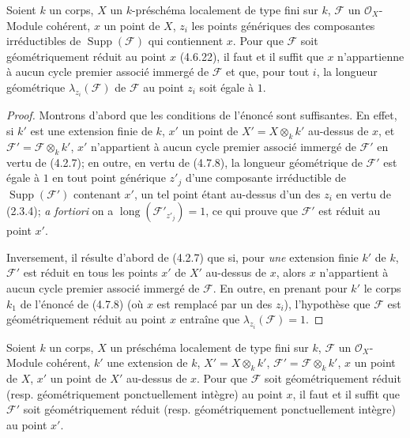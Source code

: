 \begin{proposition}[4.7.10]
\label{IV.2.4.7.10-fr}
Soient $k$ un corps, $X$ un $k$-préschéma localement de type fini sur $k$,
$\mathscr F$ un $\mathcal O_X$-Module cohérent, $x$ un point de $X$, $z_i$
les points génériques des composantes irréductibles de
$\operatorname{Supp}(\mathscr F)$ qui contiennent $x$. Pour que $\mathscr F$
soit géométriquement réduit au point $x$ \textup{(4.6.22)}, il faut et il suffit que
$x$ n'appartienne à aucun cycle premier associé immergé de $\mathscr F$ et
que, pour tout $i$, la longueur géométrique $\lambda_{z_i}(\mathscr F)$ de
$\mathscr F$ au point $z_i$ soit égale à $1$.
\end{proposition}

\begin{proof}
Montrons d'abord que les conditions de l'énoncé sont suffisantes. En effet, si
$k'$ est une extension finie de $k$, $x'$ un point de
$X'=X\otimes_k k'$ au-dessus de $x$, et
$\mathscr F'=\mathscr F\otimes_k k'$, $x'$ n'appartient à aucun cycle premier
associé immergé de $\mathscr F'$ en vertu de (4.2.7); en outre, en vertu de
(4.7.8), la longueur géométrique de $\mathscr F'$ est égale à $1$ en tout
point générique $z'_j$ d'une composante irréductible de
$\operatorname{Supp}(\mathscr F')$ contenant $x'$, un tel point étant
au-dessus d'un des $z_i$ en vertu de (2.3.4); \emph{a fortiori} on a
$\operatorname{long}(\mathscr F'_{z'_j})=1$, ce qui prouve que $\mathscr F'$
est réduit au point $x'$.

Inversement, il résulte d'abord de (4.2.7) que si, pour \emph{une} extension finie
$k'$ de $k$, $\mathscr F'$ est réduit en tous les points $x'$ de $X'$
au-dessus de $x$, alors $x$ n'appartient à aucun cycle premier associé immergé
de $\mathscr F$. En outre, en prenant pour $k'$ le corps $k_1$ de l'énoncé de
(4.7.8) (où $x$ est remplacé par un des $z_i$), l'hypothèse que $\mathscr F$
est géométriquement réduit au point $x$ entraîne que
$\lambda_{z_i}(\mathscr F)=1$.
\end{proof}

\begin{proposition}[4.7.11]
\label{IV.2.4.7.11-fr}
Soient $k$ un corps, $X$ un préschéma localement de type fini sur $k$,
$\mathscr F$ un $\mathcal O_X$-Module cohérent, $k'$ une extension de $k$,
$X'=X\otimes_k k'$, $\mathscr F'=\mathscr F\otimes_k k'$, $x$ un point de
$X$, $x'$ un point de $X'$ au-dessus de $x$. Pour que $\mathscr F$ soit
géométriquement réduit \textup{(resp.} géométriquement ponctuellement intègre\textup{)} au point
$x$, il faut et il suffit que $\mathscr F'$ soit géométriquement réduit \textup{(resp.}
géométriquement ponctuellement intègre\textup{)} au point $x'$.
\end{proposition}

